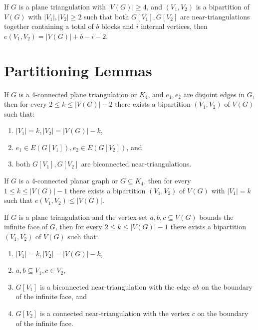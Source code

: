 \begin{corollary}
\label{cor:cut_cpnt}
If $G$ is a plane triangulation with $|V(G)| \geq 4$, and $(V_1, V_2)$ is a bipartition of $V(G)$ with $|V_1|, |V_2| \geq 2$ such that both $G[V_1], G[V_2]$ are near-triangulations together containing a total of $b$ blocks and $i$ internal vertices, then $e(V_1, V_2) = |V(G)| + b - i - 2$.
\end{corollary}

\section{Partitioning Lemmas}

\begin{lemma}
\label{lem:4con}
If $G$ is a 4-connected plane triangulation or $K_4$, and $e_1, e_2$ are disjoint edges in $G$, then for every $2 \leq k \leq |V(G)|-2$ there exists a bipartition $(V_1, V_2)$ of $V(G)$ such that:
\begin{enumerate}
\item $|V_1| = k, |V_2| = |V(G)|-k$,
\item $e_1 \in E(G[V_1]), e_2 \in E(G[V_2])$, and
\item both $G[V_1], G[V_2]$ are biconnected near-triangulations.
\end{enumerate}
\end{lemma}

\begin{corollary}
\label{cor:conj_4con}
If $G$ is a 4-connected planar graph or $G \subseteq K_4$, then for every $1 \leq k \leq |V(G)|-1$ there exists a bipartition $(V_1, V_2)$ of $V(G)$ with $|V_1| = k$ such that $e(V_1, V_2) \leq |V(G)|$.
\end{corollary}

\begin{lemma}
\label{lem:3con1}
If $G$ is a plane triangulation and the vertex-set ${a, b, c} \subseteq V(G)$ bounds the infinite face of $G$, then for every $2 \leq k \leq |V(G)|-1$ there exists a bipartition $(V_1, V_2)$ of $V(G)$ such that:
\begin{enumerate}
\item $|V_1| = k, |V_2| = |V(G)|-k$,
\item ${a, b} \subseteq V_1, c \in V_2$,
\item $G[V_1]$ is a biconnected near-triangulation with the edge $ab$ on the boundary of the infinite face, and
\item $G[V_2]$ is a connected near-triangulation with the vertex $c$ on the boundary of the infinite face.
\end{enumerate}
\end{lemma}


